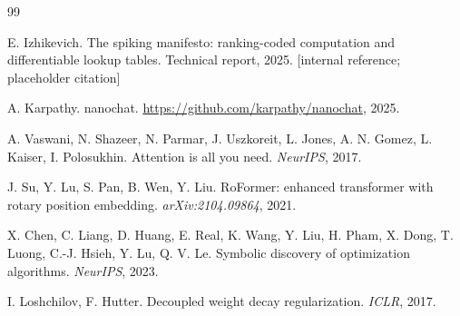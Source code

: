 \documentclass[11pt]{article}
\begin{document}
\begin{thebibliography}{99}

E. Izhikevich.
\newblock The spiking manifesto: ranking-coded computation and differentiable lookup tables.
\newblock Technical report, 2025. [internal reference; placeholder citation]

A. Karpathy.
\newblock nanochat.
\newblock \url{https://github.com/karpathy/nanochat}, 2025.

A. Vaswani, N. Shazeer, N. Parmar, J. Uszkoreit, L. Jones, A. N. Gomez, L. Kaiser, I. Polosukhin.
\newblock Attention is all you need.
\newblock \emph{NeurIPS}, 2017.

J. Su, Y. Lu, S. Pan, B. Wen, Y. Liu.
\newblock RoFormer: enhanced transformer with rotary position embedding.
\newblock \emph{arXiv:2104.09864}, 2021.

X. Chen, C. Liang, D. Huang, E. Real, K. Wang, Y. Liu, H. Pham, X. Dong, T. Luong, C.-J. Hsieh, Y. Lu, Q. V. Le.
\newblock Symbolic discovery of optimization algorithms.
\newblock \emph{NeurIPS}, 2023.

I. Loshchilov, F. Hutter.
\newblock Decoupled weight decay regularization.
\newblock \emph{ICLR}, 2017.

\end{thebibliography}
\end{document}
